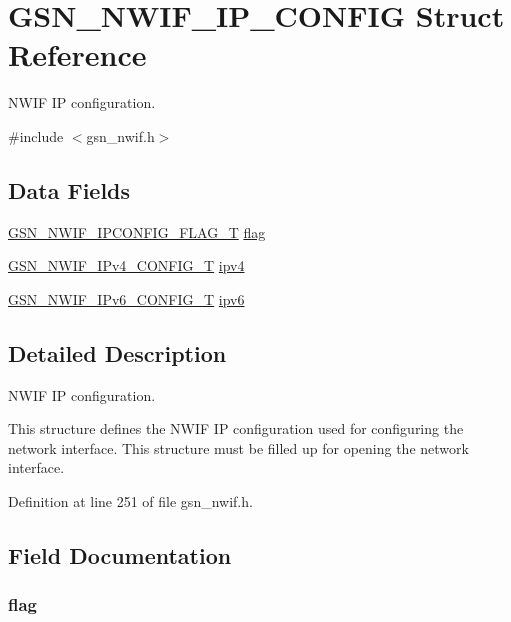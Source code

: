 \hypertarget{a00172}{
\section{GSN\_\-NWIF\_\-IP\_\-CONFIG Struct Reference}
\label{a00172}
}


NWIF IP configuration.  




{\ttfamily \#include $<$gsn\_\-nwif.h$>$}

\subsection*{Data Fields}
\begin{DoxyCompactItemize}
\item 
\hyperlink{a00670_ga952c642f49bc1ff0ab65d34c4843b5e9}{GSN\_\-NWIF\_\-IPCONFIG\_\-FLAG\_\-T} \hyperlink{a00172_a5283aa54222f1e62e63949ef45e5274d}{flag}
\item 
\hyperlink{a00170}{GSN\_\-NWIF\_\-IPv4\_\-CONFIG\_\-T} \hyperlink{a00172_afe4dd480490754207d7a4bfff0ae847e}{ipv4}
\item 
\hyperlink{a00171}{GSN\_\-NWIF\_\-IPv6\_\-CONFIG\_\-T} \hyperlink{a00172_a287dc5eb930eaa525053f2faef9c499d}{ipv6}
\end{DoxyCompactItemize}


\subsection{Detailed Description}
NWIF IP configuration. 

This structure defines the NWIF IP configuration used for configuring the network interface. This structure must be filled up for opening the network interface. 

Definition at line 251 of file gsn\_\-nwif.h.



\subsection{Field Documentation}
\hypertarget{a00172_a5283aa54222f1e62e63949ef45e5274d}{
\subsubsection[{flag}]{ {\bf flag}}}
\label{a00172_a5283aa54222f1e62e63949ef45e5274d}


